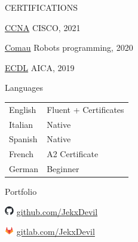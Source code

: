 \documentclass{cv} %
\def\iconsize{0.4cm}
\def\sidespacing{0.5cm}
\begin{document}
\begin{minipage}[b][0.9\paperheight][t]{0.29\linewidth}
\begin{rSection}{CERTIFICATIONS}
    \item \underline{CCNA} {CISCO, 2021}
    \item \underline{Comau} {Robots programming, 2020}
    \item \underline{ECDL} {AICA, 2019}
\end{rSection}

\vspace{\sidespacing}

\begin{rSection}{Languages}
    \vspace{0.2cm}
    \item \begin{tabular}{@{}ll@{}}
        English & Fluent + Certificates     \\
        Italian & Native                    \\
        Spanish & Native                    \\
        French  & A2 Certificate            \\
        German  & Beginner                  \\
    \end{tabular}
\end{rSection}

\vspace{\sidespacing}

\begin{rSection}{Portfolio}
    \item[]\includegraphics[width=\iconsize, trim={0cm 0.4cm 0cm 0cm}]{github-mark.png}
        \href{https://github.com/JekxDevil}{github.com/JekxDevil} 
    
    \item[]\includegraphics[width=\iconsize, trim={0cm 0.5cm 0cm 0cm}]{gitlab-icon.png}
        \href{https://gitlab.com/JekxDevil}{gitlab.com/JekxDevil}


\end{rSection}
\end{minipage}
\end{document}
